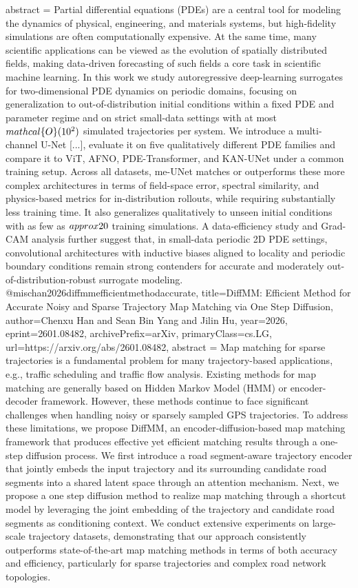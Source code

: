 {      abstract = {Partial differential equations (PDEs) are a central tool for modeling the dynamics of physical, engineering, and materials systems, but high-fidelity simulations are often computationally expensive. At the same time, many scientific applications can be viewed as the evolution of spatially distributed fields, making data-driven forecasting of such fields a core task in scientific machine learning. In this work we study autoregressive deep-learning surrogates for two-dimensional PDE dynamics on periodic domains, focusing on generalization to out-of-distribution initial conditions within a fixed PDE and parameter regime and on strict small-data settings with at most $\\mathcal\{O\}(10^2)$ simulated trajectories per system. We introduce a multi-channel U-Net [...], evaluate it on five qualitatively different PDE families and compare it to ViT, AFNO, PDE-Transformer, and KAN-UNet under a common training setup. Across all datasets, me-UNet matches or outperforms these more complex architectures in terms of field-space error, spectral similarity, and physics-based metrics for in-distribution rollouts, while requiring substantially less training time. It also generalizes qualitatively to unseen initial conditions with as few as $\\approx 20$ training simulations. A data-efficiency study and Grad-CAM analysis further suggest that, in small-data periodic 2D PDE settings, convolutional architectures with inductive biases aligned to locality and periodic boundary conditions remain strong contenders for accurate and moderately out-of-distribution-robust surrogate modeling.}
}@misc{han2026diffmmefficientmethodaccurate,
      title={DiffMM: Efficient Method for Accurate Noisy and Sparse Trajectory Map Matching via One Step Diffusion}, 
      author={Chenxu Han and Sean Bin Yang and Jilin Hu},
      year={2026},
      eprint={2601.08482},
      archivePrefix={arXiv},
      primaryClass={cs.LG},
      url={https://arxiv.org/abs/2601.08482},
      abstract = {Map matching for sparse trajectories is a fundamental problem for many trajectory-based applications, e.g., traffic scheduling and traffic flow analysis. Existing methods for map matching are generally based on Hidden Markov Model (HMM) or encoder-decoder framework. However, these methods continue to face significant challenges when handling noisy or sparsely sampled GPS trajectories. To address these limitations, we propose DiffMM, an encoder-diffusion-based map matching framework that produces effective yet efficient matching results through a one-step diffusion process. We first introduce a road segment-aware trajectory encoder that jointly embeds the input trajectory and its surrounding candidate road segments into a shared latent space through an attention mechanism. Next, we propose a one step diffusion method to realize map matching through a shortcut model by leveraging the joint embedding of the trajectory and candidate road segments as conditioning context. We conduct extensive experiments on large-scale trajectory datasets, demonstrating that our approach consistently outperforms state-of-the-art map matching methods in terms of both accuracy and efficiency, particularly for sparse trajectories and complex road network topologies.}
}
